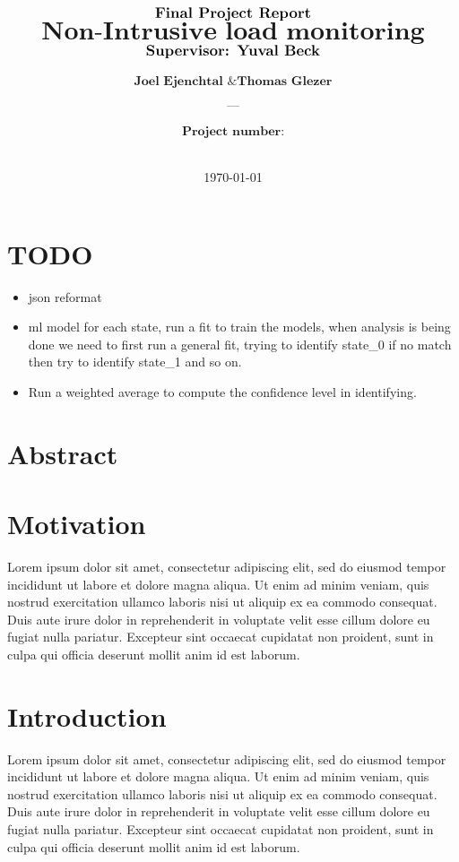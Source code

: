 \documentclass[12pt, letterpaper]{article}
\title{%
  $\large \textbf{Final Project Report}$ \\
  $\textbf{Non-Intrusive load monitoring}$ \\
  $\large \textbf{Supervisor: Yuval Beck}$
}
\author{
  $\textbf{Joel Ejenchtal \& Thomas Glezer}$\\\\
  $\textbf{---}$\\\\
  $\textbf{Project number:}$
  \\\\
}
\date{\today}
\begin{document}
\begin{titlingpage}
  \maketitle
\end{titlingpage}

\pagebreak


\tableofcontents


\pagebreak


\section{TODO}

\begin{itemize}
  \item json reformat
  \item ml model for each state, run a fit to train the models, when analysis is being done we need to first run a general fit, trying to identify state\_0 if no match then try to identify state\_1 and so on.
  \item Run a weighted average to compute the confidence level in identifying.
\end{itemize}

\section{Abstract}




\section{Motivation}

Lorem ipsum dolor sit amet, consectetur adipiscing elit, sed do eiusmod tempor incididunt ut labore et dolore magna aliqua. Ut enim ad minim veniam, quis nostrud exercitation ullamco laboris nisi ut aliquip ex ea commodo consequat. Duis aute irure dolor in reprehenderit in voluptate velit esse cillum dolore eu fugiat nulla pariatur. Excepteur sint occaecat cupidatat non proident, sunt in culpa qui officia deserunt mollit anim id est laborum.

\section{Introduction}

Lorem ipsum dolor sit amet, consectetur adipiscing elit, sed do eiusmod tempor incididunt ut labore et dolore magna aliqua. Ut enim ad minim veniam, quis nostrud exercitation ullamco laboris nisi ut aliquip ex ea commodo consequat. Duis aute irure dolor in reprehenderit in voluptate velit esse cillum dolore eu fugiat nulla pariatur. Excepteur sint occaecat cupidatat non proident, sunt in culpa qui officia deserunt mollit anim id est laborum.
\end{document}
